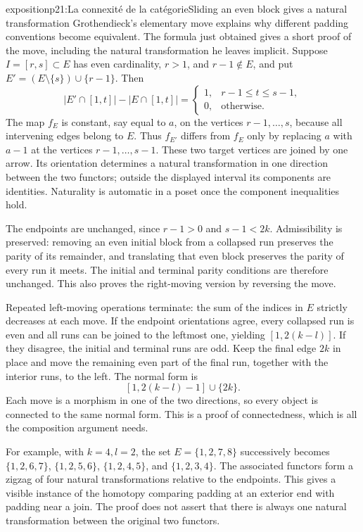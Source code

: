 \begin{dcomment}{exposition}{p21:La connexité de la catégorie}{Sliding an even block gives a natural transformation}
Grothendieck's elementary move explains why different padding conventions become equivalent. The formula just obtained gives a short proof of the move, including the natural transformation he leaves implicit. Suppose $I=[r,s]\subset E$ has even cardinality, $r>1$, and $r-1\notin E$, and put $E'=(E\setminus\{s\})\cup\{r-1\}$. Then
\[
 |E'\cap[1,t]|-|E\cap[1,t]|=
 \begin{cases}1,&r-1\leq t\leq s-1,\\0,&\text{otherwise}.
 \end{cases}
\]
The map $f_E$ is constant, say equal to $a$, on the vertices $r-1,\ldots,s$, because all intervening edges belong to $E$. Thus $f_{E'}$ differs from $f_E$ only by replacing $a$ with $a-1$ at the vertices $r-1,\ldots,s-1$. These two target vertices are joined by one arrow. Its orientation determines a natural transformation in one direction between the two functors; outside the displayed interval its components are identities. Naturality is automatic in a poset once the component inequalities hold.

The endpoints are unchanged, since $r-1>0$ and $s-1<2k$. Admissibility is preserved: removing an even initial block from a collapsed run preserves the parity of its remainder, and translating that even block preserves the parity of every run it meets. The initial and terminal parity conditions are therefore unchanged. This also proves the right-moving version by reversing the move.

Repeated left-moving operations terminate: the sum of the indices in $E$ strictly decreases at each move. If the endpoint orientations agree, every collapsed run is even and all runs can be joined to the leftmost one, yielding $[1,2(k-l)]$. If they disagree, the initial and terminal runs are odd. Keep the final edge $2k$ in place and move the remaining even part of the final run, together with the interior runs, to the left. The normal form is
\[
 [1,2(k-l)-1]\cup\{2k\}.
\]
Each move is a morphism in one of the two directions, so every object is connected to the same normal form. This is a proof of connectedness, which is all the composition argument needs.

For example, with $k=4,l=2$, the set $E=\{1,2,7,8\}$ successively becomes $\{1,2,6,7\}$, $\{1,2,5,6\}$, $\{1,2,4,5\}$, and $\{1,2,3,4\}$. The associated functors form a zigzag of four natural transformations relative to the endpoints. This gives a visible instance of the homotopy comparing padding at an exterior end with padding near a join. The proof does not assert that there is always one natural transformation between the original two functors.
\end{dcomment}


